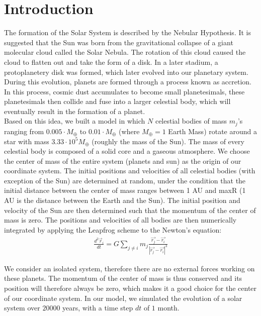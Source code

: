 \section{Introduction}
The formation of the Solar System is described by the Nebular Hypothesis. It is suggested that the Sun was born from the gravitational collapse of a giant molecular cloud called the Solar Nebula. 
The rotation of this cloud caused the cloud to flatten out and take the form of a disk. In a later stadium, a protoplanetery disk was formed, which later evolved into our planetary system.
During this evolution, planets are formed through a process known as accretion.
In this process, cosmic dust accumulates to become small planetesimals, these planetesimals then collide and fuse into a larger celestial body, which will eventually result in the formation of a planet.\\

Based on this idea, we built a model in which \(N\) celestial bodies of mass $m_j$'s ranging from $0.005\cdot M_{\oplus}$ to $0.01\cdot M_{\oplus}$ (where $M_{\oplus}=1$ Earth Mass) rotate around a star with mass $3.33\cdot 10^5 M_{\oplus}$ (roughly the mass of the Sun).
The mass of every celestial body is composed of a solid core and a gaseous atmosphere.
We choose the center of mass of the entire system (planets and sun) as the origin of our coordinate system. 
The initial positions and velocities of all celestial bodies (with exception of the Sun) are determined at random, under the condition that the initial distance between the center of mass ranges between 1 AU and  maxR (1 AU is the distance between the Earth and the Sun). 
The initial position and velocity of the Sun are then determined such that the momentum of the center of mass is zero. 
The positions and velocities of all bodies are then numerically integrated by applying the Leapfrog scheme to the Newton's equation:
\begin{align}
\frac{d^2\vec{r}_i}{dt}=G\sum_{j\neq i}m_j\frac{\vec{r_j}-\vec{r_i}}{|\vec{r_j}-\vec{r_i}|^3}\label{eq:newton}
\end{align}

We consider an isolated system, therefore there are no external forces working on these planets. 
The momentum of the center of mass is thus conserved and its position will therefore always be zero, which makes it a good choice for the center of our coordinate system. 
In our model, we simulated the evolution of a solar system over $20000$ years, with a time step $dt$ of $1$ month.\\

